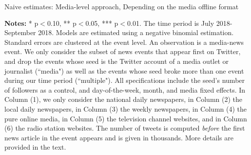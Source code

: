 \begin{table}
\caption{Naive estimates: Media-level approach, Depending on the media offline format}
\begin{center}
	
\end{center}
\begin{spacing}{0.5}
	{\fns \textbf{Notes:} * p$<$0.10, ** p$<$0.05, *** p$<$0.01. The time period is July 2018-September 2018.  Models are estimated using a negative binomial estimation. Standard errors are clustered at the event level. An observation is a media-news event. We only consider the subset of news events that appear first on Twitter, and drop the events whose seed is the Twitter account of a media outlet or journalist (``media") as well as the events whose seed broke more than one event during our time period (``multiple"). All specifications include the seed's number of followers as a control, and day-of-the-week, month, and media fixed effects. In Column (1), we only consider the national daily newspapers, in Column (2) the local daily newspapers, in Column (3) the weekly newspapers, in Column (4) the pure online media, in Column (5) the television channel websites, and in Column (6) the radio station websites. The number of tweets is computed \textit{before} the first news article in the event appears and is given in thousands. More details are provided in the text.} 
\end{spacing}
\label{Tab:number_articles_negbinomial_cevent_heterogeneity}
\end{table} 


%	


